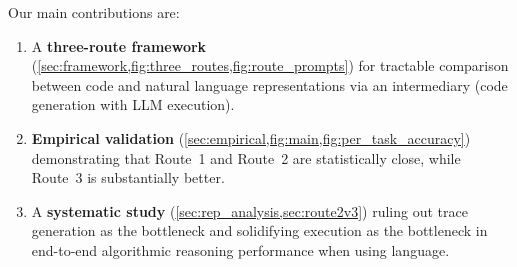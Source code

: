 






Our main contributions are:
\begin{enumerate}
    \item A \textbf{three-route framework} (\cref{sec:framework,fig:three_routes,fig:route_prompts}) for tractable comparison between code and natural language representations via an intermediary (code generation with LLM execution).
    \item \textbf{Empirical validation} (\cref{sec:empirical,fig:main,fig:per_task_accuracy}) demonstrating that Route~1 and Route~2 are statistically close, while Route~3 is substantially better.
    \item A \textbf{systematic study} (\cref{sec:rep_analysis,sec:route2v3}) ruling out trace generation as the bottleneck and solidifying execution as the bottleneck in end-to-end algorithmic reasoning performance when using language.
\end{enumerate}


